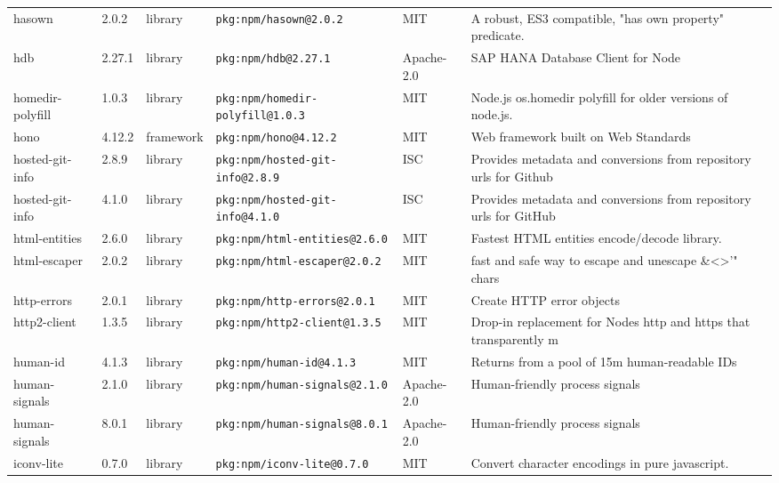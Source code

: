 \documentclass[11pt,a4paper]{article}
\begin{document}
\begin{longtable}{|p{4cm}|p{2cm}|p{1.6cm}|p{5cm}|p{1.5cm}|p{3.5cm}|}
\raggedright hasown & 2.0.2 & library & \small\texttt{pkg:npm/hasown@2.0.2} & MIT & \small A robust, ES3 compatible, "has own property" predicate. \\
\raggedright hdb & 2.27.1 & library & \small\texttt{pkg:npm/hdb@2.27.1} & Apache-2.0 & \small SAP HANA Database Client for Node \\
\raggedright homedir-polyfill & 1.0.3 & library & \small\texttt{pkg:npm/homedir-polyfill@1.0.3} & MIT & \small Node.js os.homedir polyfill for older versions of node.js. \\
\raggedright hono & 4.12.2 & framework & \small\texttt{pkg:npm/hono@4.12.2} & MIT & \small Web framework built on Web Standards \\
\raggedright hosted-git-info & 2.8.9 & library & \small\texttt{pkg:npm/hosted-git-info@2.8.9} & ISC & \small Provides metadata and conversions from repository urls for Github \\
\raggedright hosted-git-info & 4.1.0 & library & \small\texttt{pkg:npm/hosted-git-info@4.1.0} & ISC & \small Provides metadata and conversions from repository urls for GitHub \\
\raggedright html-entities & 2.6.0 & library & \small\texttt{pkg:npm/html-entities@2.6.0} & MIT & \small Fastest HTML entities encode/decode library. \\
\raggedright html-escaper & 2.0.2 & library & \small\texttt{pkg:npm/html-escaper@2.0.2} & MIT & \small fast and safe way to escape and unescape \&\textless{}\textgreater{}'" chars \\
\raggedright http-errors & 2.0.1 & library & \small\texttt{pkg:npm/http-errors@2.0.1} & MIT & \small Create HTTP error objects \\
\raggedright http2-client & 1.3.5 & library & \small\texttt{pkg:npm/http2-client@1.3.5} & MIT & \small Drop-in replacement for Nodes http and https that transparently m \\
\raggedright human-id & 4.1.3 & library & \small\texttt{pkg:npm/human-id@4.1.3} & MIT & \small Returns from a pool of 15m human-readable IDs \\
\raggedright human-signals & 2.1.0 & library & \small\texttt{pkg:npm/human-signals@2.1.0} & Apache-2.0 & \small Human-friendly process signals \\
\raggedright human-signals & 8.0.1 & library & \small\texttt{pkg:npm/human-signals@8.0.1} & Apache-2.0 & \small Human-friendly process signals \\
\raggedright iconv-lite & 0.7.0 & library & \small\texttt{pkg:npm/iconv-lite@0.7.0} & MIT & \small Convert character encodings in pure javascript. \\

\end{longtable}
\end{document}
